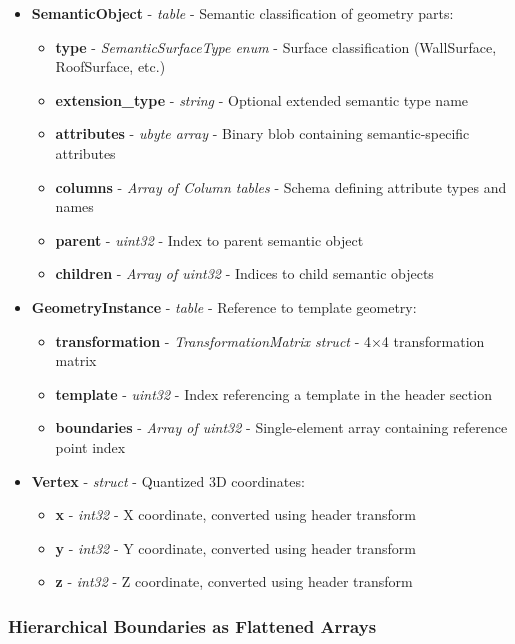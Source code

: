 \begin{itemize}
  \item \textbf{SemanticObject} - \textit{table} - Semantic classification of geometry parts:
    \begin{itemize}
      \item \textbf{type} - \textit{SemanticSurfaceType enum} - Surface classification (WallSurface, RoofSurface, etc.)
      \item \textbf{extension\_type} - \textit{string} - Optional extended semantic type name
      \item \textbf{attributes} - \textit{ubyte array} - Binary blob containing semantic-specific attributes
      \item \textbf{columns} - \textit{Array of Column tables} - Schema defining attribute types and names
      \item \textbf{parent} - \textit{uint32} - Index to parent semantic object
      \item \textbf{children} - \textit{Array of uint32} - Indices to child semantic objects
    \end{itemize}

  \item \textbf{GeometryInstance} - \textit{table} - Reference to template geometry:
    \begin{itemize}
      \item \textbf{transformation} - \textit{TransformationMatrix struct} - 4×4 transformation matrix
      \item \textbf{template} - \textit{uint32} - Index referencing a template in the header section
      \item \textbf{boundaries} - \textit{Array of uint32} - Single-element array containing reference point index
    \end{itemize}

  \item \textbf{Vertex} - \textit{struct} - Quantized 3D coordinates:
    \begin{itemize}
      \item \textbf{x} - \textit{int32} - X coordinate, converted using header transform
      \item \textbf{y} - \textit{int32} - Y coordinate, converted using header transform
      \item \textbf{z} - \textit{int32} - Z coordinate, converted using header transform
    \end{itemize}
\end{itemize}

\subsubsection{Hierarchical Boundaries as Flattened Arrays}
\label{methodology:feature_encoding:geometry_encoding:flattened_arrays}

